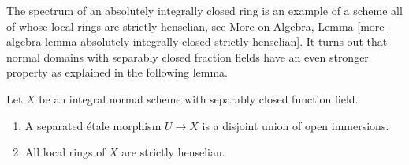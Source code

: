 \noindent
The spectrum of an absolutely integrally closed ring
is an example of a scheme all of whose local rings are
strictly henselian, see More on Algebra, Lemma
\ref{more-algebra-lemma-absolutely-integrally-closed-strictly-henselian}.
It turns out that normal domains with separably closed fraction
fields have an even stronger property as explained in the
following lemma.

\begin{lemma}
\label{lemma-normal-scheme-with-alg-closed-function-field}
Let $X$ be an integral normal scheme with separably closed
function field.
\begin{enumerate}
\item A separated \'etale morphism $U \to X$ is a
disjoint union of open immersions.
\item All local rings of $X$ are strictly henselian.
\end{enumerate}
\end{lemma}

